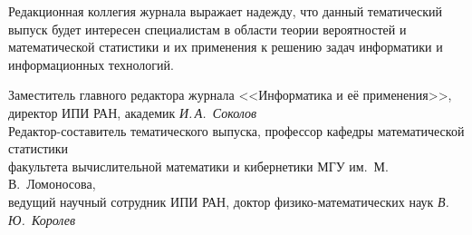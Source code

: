 {{{      Редакционная коллегия журнала выражает надежду, что данный тематический  
выпуск будет интересен специалистам в области теории вероятностей и математической 
статистики и их применения к решению задач информатики и информационных 
технологий.
      
\vspace*{6mm}
\noindent
Заместитель главного редактора журнала <<Информатика и её применения>>,\\
директор ИПИ РАН, академик  \hfill
\textit{И.\,А.~Соколов}\\[-6pt]

\noindent
Редактор-составитель тематического выпуска, профессор кафедры математической статистики\\
факультета вычислительной математики и кибернетики МГУ им.~М.\,В.~Ломоносова,\\
ведущий научный сотрудник ИПИ РАН, доктор физико-математических наук\hfill
 \textit{В.\,Ю.~Королев}


} }
}
      